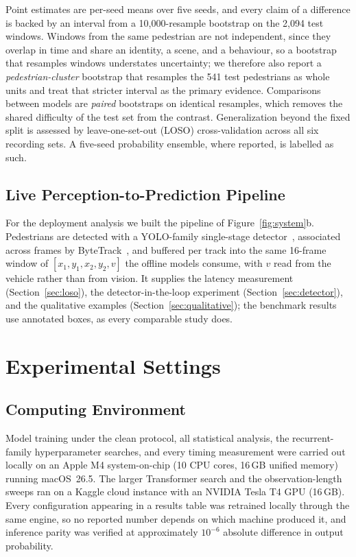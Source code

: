 \documentclass[mti,article,submit,moreauthors]{Definitions/mdpi}
\begin{document}
Point estimates are per-seed means over five seeds, and every claim of a difference is backed by an interval from a 10,000-resample bootstrap on the 2,094 test windows. Windows from the same pedestrian are not independent, since they overlap in time and share an identity, a scene, and a behaviour, so a bootstrap that resamples windows understates uncertainty; we therefore also report a \emph{pedestrian-cluster} bootstrap that resamples the 541 test pedestrians as whole units and treat that stricter interval as the primary evidence. Comparisons between models are \emph{paired} bootstraps on identical resamples, which removes the shared difficulty of the test set from the contrast. Generalization beyond the fixed split is assessed by leave-one-set-out (LOSO) cross-validation across all six recording sets. A five-seed probability ensemble, where reported, is labelled as such.

\subsection{Live Perception-to-Prediction Pipeline}
\label{sec:pipeline}

For the deployment analysis we built the pipeline of Figure~\ref{fig:system}b. Pedestrians are detected with a YOLO-family single-stage detector~\citep{jocher2025yolo}, associated across frames by ByteTrack~\citep{zhang2022bytetrack}, and buffered per track into the same 16-frame window of $[x_1, y_1, x_2, y_2, v]$ the offline models consume, with $v$ read from the vehicle rather than from vision. It supplies the latency measurement (Section~\ref{sec:loso}), the detector-in-the-loop experiment (Section~\ref{sec:detector}), and the qualitative examples (Section~\ref{sec:qualitative}); the benchmark results use annotated boxes, as every comparable study does.

\section{Experimental Settings}
\label{sec:settings}

\subsection{Computing Environment}

Model training under the clean protocol, all statistical analysis, the recurrent-family hyperparameter searches, and every timing measurement were carried out locally on an Apple M4 system-on-chip (10 CPU cores, 16\,GB unified memory) running macOS~26.5. The larger Transformer search and the observation-length sweeps ran on a Kaggle cloud instance with an NVIDIA Tesla T4 GPU (16\,GB). Every configuration appearing in a results table was retrained locally through the same engine, so no reported number depends on which machine produced it, and inference parity was verified at approximately $10^{-6}$ absolute difference in output probability.
\end{document}
